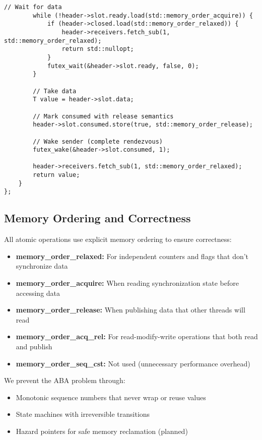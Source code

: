 \documentclass[11pt]{article}
\begin{document}
\begin{lstlisting}[caption={Unbuffered Channel with Rendezvous}]
        // Wait for data
        while (!header->slot.ready.load(std::memory_order_acquire)) {
            if (header->closed.load(std::memory_order_relaxed)) {
                header->receivers.fetch_sub(1, std::memory_order_relaxed);
                return std::nullopt;
            }
            futex_wait(&header->slot.ready, false, 0);
        }
        
        // Take data
        T value = header->slot.data;
        
        // Mark consumed with release semantics
        header->slot.consumed.store(true, std::memory_order_release);
        
        // Wake sender (complete rendezvous)
        futex_wake(&header->slot.consumed, 1);
        
        header->receivers.fetch_sub(1, std::memory_order_relaxed);
        return value;
    }
};
\end{lstlisting}

\subsection{Memory Ordering and Correctness}

All atomic operations use explicit memory ordering to ensure correctness:

\begin{itemize}
\item \textbf{memory\_order\_relaxed:} For independent counters and flags that don't synchronize data
\item \textbf{memory\_order\_acquire:} When reading synchronization state before accessing data
\item \textbf{memory\_order\_release:} When publishing data that other threads will read
\item \textbf{memory\_order\_acq\_rel:} For read-modify-write operations that both read and publish
\item \textbf{memory\_order\_seq\_cst:} Not used (unnecessary performance overhead)
\end{itemize}

We prevent the ABA problem through:
\begin{itemize}
\item Monotonic sequence numbers that never wrap or reuse values
\item State machines with irreversible transitions
\item Hazard pointers for safe memory reclamation (planned)
\end{itemize}
\end{document}
